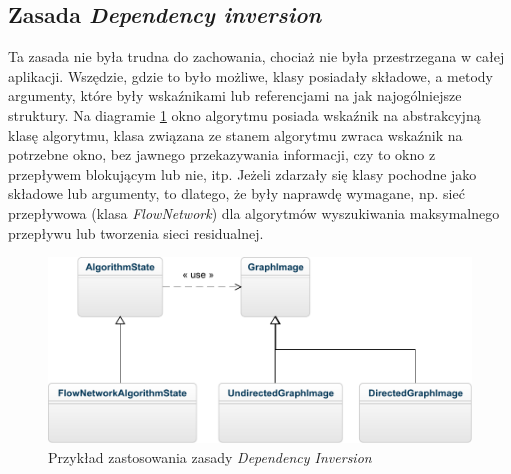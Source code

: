 \subsection{Zasada \textit{Dependency inversion}}
Ta zasada nie była trudna do zachowania, chociaż nie była przestrzegana w całej aplikacji. Wszędzie, gdzie to było możliwe, klasy posiadały składowe, a metody argumenty, które były wskaźnikami lub referencjami na jak najogólniejsze struktury. Na diagramie \ref{fig:SOLD_DI} okno algorytmu posiada wskaźnik na abstrakcyjną klasę algorytmu, klasa związana ze stanem algorytmu zwraca wskaźnik na potrzebne okno, bez jawnego przekazywania informacji, czy to okno z przepływem blokującym lub nie, itp. Jeżeli zdarzały się klasy pochodne jako składowe lub argumenty, to dlatego, że były naprawdę wymagane, np. sieć przepływowa (klasa \emph{FlowNetwork}) dla algorytmów wyszukiwania maksymalnego przepływu lub tworzenia sieci residualnej.
\begin{figure}[H]
	\centering
	\includegraphics[width=0.8\linewidth]{./img/SOLD_DI.pdf}
	\caption{Przykład zastosowania zasady \textit{Dependency Inversion}}
	\label{fig:SOLD_DI}
\end{figure}
